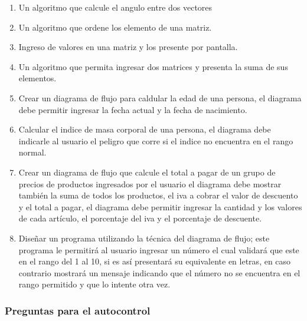 \documentclass[a4paper,12pt,spanish]{article}
\begin{document}
\begin{enumerate}
\item Un algoritmo que calcule el angulo entre dos vectores
\item Un algoritmo que ordene los elemento de una matriz.
\item Ingreso de valores en una matriz y los presente por pantalla.
\item Un algoritmo que permita ingresar dos matrices y presenta la suma de sus elementos.
\item Crear un diagrama de flujo para caldular la edad de una persona, el diagrama debe permitir ingresar la fecha actual y la fecha de nacimiento.
\item Calcular el indice de masa corporal de una persona, el diagrama debe indicarle al usuario el peligro que corre si el indice no  encuentra en el rango normal.
\item Crear un diagrama de flujo que calcule el total  a pagar de un grupo de precios de productos ingresados por el usuario el diagrama debe mostrar también la suma de todos los productos, el iva a cobrar el valor de descuento y el total a pagar, el diagrama debe permitir ingresar la cantidad y los valores de cada artículo, el porcentaje del iva y el porcentaje de descuente.
\item Diseñar un programa utilizando la técnica del diagrama de flujo; este programa  le permitirá al usuario ingresar un número el cual validará que este en el rango del 1 al 10, si es así presentará su equivalente en letras, en caso contrario mostrará un mensaje indicando que el número no se encuentra en el rango permitido y que lo intente otra vez.
\end{enumerate}





\newpage

\subsubsection{Preguntas para el autocontrol}
\label{sec:preguntas-para-el-2}
\end{document}
